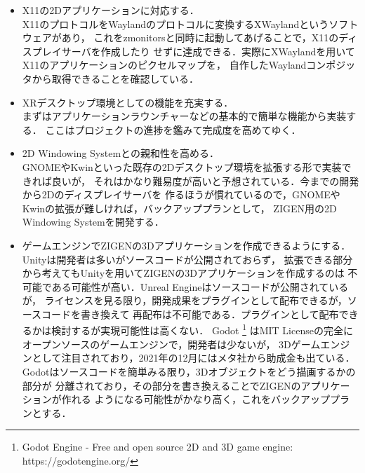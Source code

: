 \begin{itemize}
  \item X11の2Dアプリケーションに対応する．\\
        X11のプロトコルをWaylandのプロトコルに変換するXWaylandというソフトウェアがあり，
        これをzmonitorsと同時に起動してあげることで，X11のディスプレイサーバを作成したり
        せずに達成できる．実際にXWaylandを用いてX11のアプリケーションのピクセルマップを，
        自作したWaylandコンポジッタから取得できることを確認している．

  \item XRデスクトップ環境としての機能を充実する．\\
        まずはアプリケーションラウンチャーなどの基本的で簡単な機能から実装する．
        ここはプロジェクトの進捗を鑑みて完成度を高めてゆく．

  \item 2D Windowing Systemとの親和性を高める．\\
        GNOMEやKwinといった既存の2Dデスクトップ環境を拡張する形で実装できれば良いが，
        それはかなり難易度が高いと予想されている．今までの開発から2Dのディスプレイサーバを
        作るほうが慣れているので，GNOMEやKwinの拡張が難しければ，バックアッププランとして，
        ZIGEN用の2D Windowing Systemを開発する．

  \item ゲームエンジンでZIGENの3Dアプリケーションを作成できるようにする．\\
        Unityは開発者は多いがソースコードが公開されておらず，
        拡張できる部分から考えてもUnityを用いてZIGENの3Dアプリケーションを作成するのは
        不可能である可能性が高い．Unreal Engineはソースコードが公開されているが，
        ライセンスを見る限り，開発成果をプラグインとして配布できるが，ソースコードを書き換えて
        再配布は不可能である．プラグインとして配布できるかは検討するが実現可能性は高くない．
        Godot
        \footnote{Godot Engine - Free and open source 2D and 3D game engine: https://godotengine.org/}
        はMIT Licenseの完全にオープンソースのゲームエンジンで，開発者は少ないが，
        3Dゲームエンジンとして注目されており，2021年の12月にはメタ社から助成金も出ている．
        Godotはソースコードを簡単みる限り，3Dオブジェクトをどう描画するかの部分が
        分離されており，その部分を書き換えることでZIGENのアプリケーションが作れる
        ようになる可能性がかなり高く，これをバックアッププランとする．


\end{itemize}
